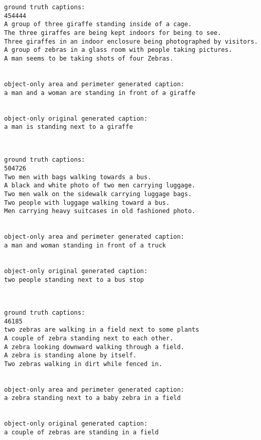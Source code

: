 \documentclass[11pt]{article}
\begin{document}
    \begin{Verbatim}[commandchars=\\\{\}]
ground truth captions:
454444
A group of three giraffe standing inside of a cage.
The three giraffes are being kept indoors for being to see. 
Three giraffes in an indoor enclosure being photographed by visitors.
A group of zebras in a glass room with people taking pictures.
A man seems to be taking shots of four Zebras. 


object-only area and perimeter generated caption:
a man and a woman are standing in front of a giraffe


object-only original generated caption:
a man is standing next to a giraffe

    \end{Verbatim}

    \begin{center}
    \end{center}
    { \hspace*{\fill} \\}
    
    \begin{Verbatim}[commandchars=\\\{\}]
ground truth captions:
504726
Two men with bags walking towards a bus.
A black and white photo of two men carrying luggage.
Two men walk on the sidewalk carrying luggage bags. 
Two people with luggage walking toward a bus.
Men carrying heavy suitcases in old fashioned photo.


object-only area and perimeter generated caption:
a man and woman standing in front of a truck


object-only original generated caption:
two people standing next to a bus stop

    \end{Verbatim}

    \begin{center}
    \end{center}
    { \hspace*{\fill} \\}
    
    \begin{Verbatim}[commandchars=\\\{\}]
ground truth captions:
46185
two zebras are walking in a field next to some plants
A couple of zebra standing next to each other.
A zebra looking downward walking through a field.
A zebra is standing alone by itself. 
Two zebras walking in dirt while fenced in. 


object-only area and perimeter generated caption:
a zebra standing next to a baby zebra in a field


object-only original generated caption:
a couple of zebras are standing in a field

    \end{Verbatim}
\end{document}
